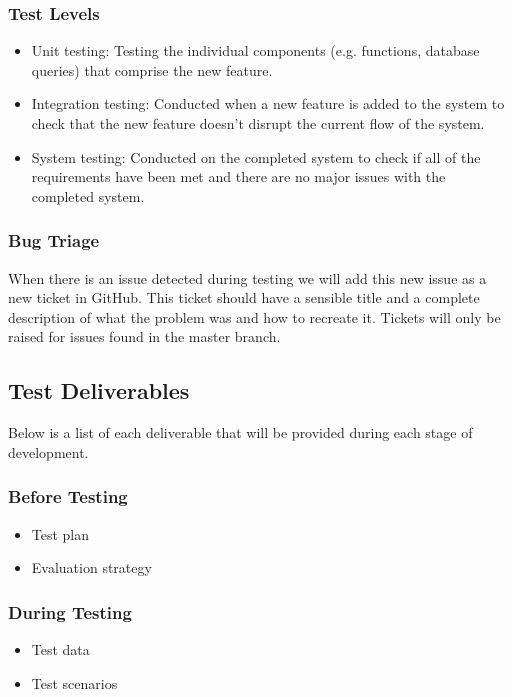 \documentclass[11pt, a4paper]{article}
\begin{document}
\subsubsection{Test Levels}

\begin{itemize}
  \item Unit testing: Testing the individual components (e.g. functions, database queries) that comprise the new feature.
  \item Integration testing: Conducted when a new feature is added to the system to check that the new feature doesn't disrupt the current flow of the system.
  \item System testing: Conducted on the completed system to check if all of the requirements have been met and there are no major issues with the completed system.
\end{itemize}

\subsubsection{Bug Triage}
When there is an issue detected during testing we will add this new issue as a new ticket in GitHub. This ticket should have a sensible title and a complete description of what the problem was and how to recreate it. Tickets will only be raised for issues found in the master branch.

\subsection{Test Deliverables}
Below is a list of each deliverable that will be provided during each stage of development.
\subsubsection*{Before Testing}
\begin{itemize}
    \item Test plan
    \item Evaluation strategy
\end{itemize}

\subsubsection*{During Testing}
\begin{itemize}
    \item Test data
    \item Test scenarios
\end{itemize}
\end{document}
